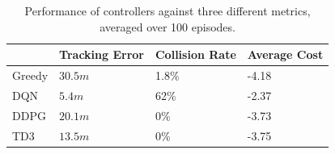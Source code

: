 \documentclass[10pt,twocolumn,letterpaper]{article}
\begin{document}
\begin{table}[]
\begin{tabular}{|l|l|l|l|}
\hline
       & Tracking Error & Collision Rate & Average Cost \\ \hline
Greedy & $30.5m$        & 1.8\%          & -4.18        \\ \hline
DQN    & $5.4m$         & 62\%           & -2.37        \\ \hline
DDPG   & $20.1m$        & 0\%            & -3.73        \\ \hline
TD3    & $13.5m$        & 0\%            & -3.75        \\ \hline
\end{tabular}
\caption{Performance of controllers against three different metrics, averaged over 100 episodes.}
\label{results}
\end{table}
\end{document}
